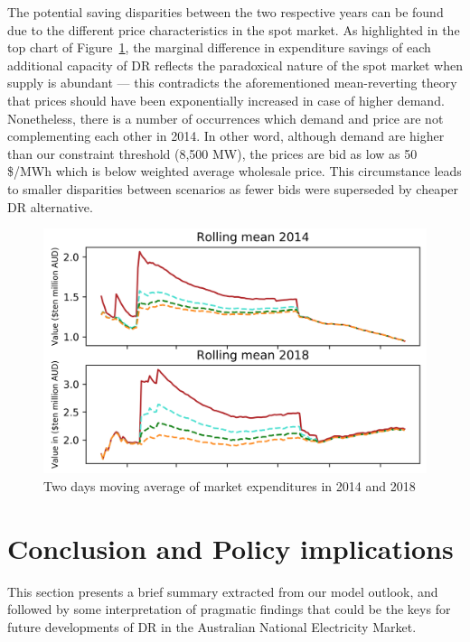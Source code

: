 \documentclass{pasa}%
\begin{document}
The potential saving disparities between the two respective years can be found due to the different price characteristics in the spot market. As highlighted in the top chart of Figure~\ref{fig:Figrollingmean}, the marginal difference in expenditure savings of each additional capacity of DR reflects the paradoxical nature of the spot market when supply is abundant --- this contradicts the aforementioned mean-reverting theory that prices should have been exponentially increased in case of higher demand. Nonetheless, there is a number of occurrences which demand and price are not complementing each other in 2014. In other word, although demand are higher than our constraint threshold (8,500 MW), the prices are bid as low as 50 \$/MWh which is below weighted average wholesale price. This circumstance leads to smaller disparities between scenarios as fewer bids were superseded by cheaper DR alternative.


\begin{figure}
\begin{center}
\includegraphics[width=.9\textwidth,height=.6\textheight,keepaspectratio]{DR/PASA_example/Figures_DR/rollingmean.png}
\caption{Two days moving average of market expenditures in 2014 and 2018}\label{fig:Figrollingmean}
\end{center}
\end{figure}



\section{Conclusion and Policy implications}

This section presents a brief summary extracted from our model outlook, and followed by some interpretation of pragmatic findings that could be the keys for future developments of DR in the Australian National Electricity Market.
\end{document}
